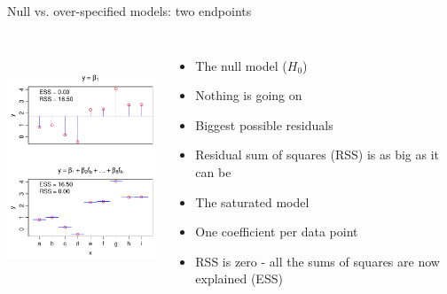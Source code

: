 \documentclass[xcolor=x11names,handout,compress]{beamer}
\renewcommand{\(}{\begin{columns}}
\renewcommand{\)}{\end{columns}}
\newcommand{\<}[1]{\begin{column}{#1}}
\renewcommand{\>}{\end{column}}
\begin{document}
\begin{frame}{Null vs. over-specified models: two endpoints}

    \begin{columns}[T]
		\includegraphics[height=72mm]{NullSaturated.pdf}

		\begin{itemize}
		\item The null model ($H_0$)
		\item Nothing is going on
		\item Biggest possible residuals
		\item Residual sum of squares (RSS) is as big as it can be
		\vspace{1cm}
		\item The saturated model
		\item One coefficient per data point
		\item RSS is zero - all the sums of squares are now explained (ESS)
		\end{itemize}
		
\end{columns}
\end{frame}
\end{document}
